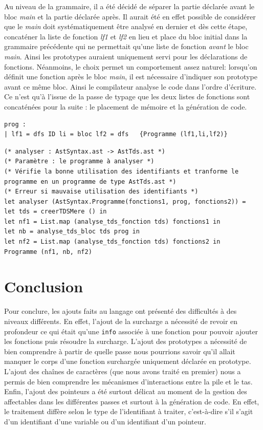 \documentclass[11pt,a4paper]{article}
\begin{document}
Au niveau de la grammaire, il a été décidé de séparer la partie déclarée avant le bloc \emph{main} et la partie déclarée après. Il aurait été en effet possible de considérer que le \emph{main} doit systématiquement être analysé en dernier et dès cette étape, concaténer la liste de fonction \emph{lf1} et \emph{lf2} en lieu et place du bloc initial dans la grammaire précédente qui ne permettait qu'une liste de fonction \emph{avant} le bloc \emph{main}. Ainsi les prototypes auraient uniquement servi pour les déclarations de fonctions. Néanmoins, le choix permet un comportement assez naturel: lorsqu'on définit une fonction après le bloc \emph{main}, il est nécessaire d'indiquer son prototype avant ce même bloc. Ainsi le compilateur analyse le code dans l'ordre d'écriture. Ce n'est qu'à l'issue de la passe de typage que les deux listes de fonctions sont concaténées pour la suite : le placement de mémoire et la génération de code.

\begin{verbatim}
prog :
| lf1 = dfs ID li = bloc lf2 = dfs   {Programme (lf1,li,lf2)}
\end{verbatim}

\begin{verbatim}
(* analyser : AstSyntax.ast -> AstTds.ast *)
(* Paramètre : le programme à analyser *)
(* Vérifie la bonne utilisation des identifiants et tranforme le 
programme en un programme de type AstTds.ast *)
(* Erreur si mauvaise utilisation des identifiants *)
let analyser (AstSyntax.Programme(fonctions1, prog, fonctions2)) =
let tds = creerTDSMere () in
let nf1 = List.map (analyse_tds_fonction tds) fonctions1 in
let nb = analyse_tds_bloc tds prog in
let nf2 = List.map (analyse_tds_fonction tds) fonctions2 in
Programme (nf1, nb, nf2)
\end{verbatim}

\section{Conclusion}

Pour conclure, les ajouts faits au langage ont présenté des difficultés à des niveaux différents. En effet, l'ajout de la surcharge a nécessité de revoir en profondeur ce qui était qu'une \texttt{info} associée à une fonction pour pouvoir ajouter les fonctions puis résoudre la surcharge. L'ajout des prototypes a nécessité de bien comprendre à partir de quelle passe nous pourrions savoir qu'il allait manquer le corps d'une fonction surchargée uniquement déclarée en prototype. L'ajout des chaînes de caractères (que nous avons traité en premier) nous a permis de bien comprendre les mécanismes d'interactions entre la pile et le tas. Enfin, l'ajout des pointeurs a été surtout délicat au moment de la gestion des affectables dans les différentes passes et surtout à la génération de code. En effet, le traitement diffère selon le type de l'identifiant à traiter, c'est-à-dire s'il s'agit d'un identifiant d'une variable ou d'un identifiant d'un pointeur.
\end{document}
